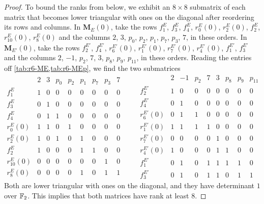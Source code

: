 \begin{proof}
To bound the ranks from below, we exhibit an $8\times8$ submatrix of each matrix that becomes lower triangular with ones on the diagonal after reordering its rows and columns. In $\mathbf M_E(0)$, take the rows $f^E_1$, $f^E_3$, $f^E_4$, $r^E_0(0)$, $r^E_2(0)$, $f^E_2$, $r^E_{10}(0)$, $r^E_8(0)$ and the columns $2$, $3$, $p_0$, $p_2$, $p_1$, $p_7$, $p_3$, $7$, in these orders. In $\mathbf M_{E'}(0)$, take the rows $f^{E'}_2$, $f^{E'}_4$, $r^{E'}_6(0)$, $r^{E'}_1(0)$, $r^{E'}_7(0)$, $r^{E'}_4(0)$, $f^{E'}_1$, $f^{E'}_3$ and the columns $2$, $-1$, $p_2$, $7$, $3$, $p_8$, $p_9$, $p_{11}$, in these orders. Reading the entries off \cref{tab:r6-ME,tab:r6-MEp}, we find the two submatrices
\[
\begin{array}{c|cccccccc}
 & 2 & 3 & p_0 & p_2 & p_1 & p_7 & p_3 & 7\\
\hline
f^E_1 & 1 & 0 & 0 & 0 & 0 & 0 & 0 & 0 \\
f^E_3 & 0 & 1 & 0 & 0 & 0 & 0 & 0 & 0 \\
f^E_4 & 0 & 1 & 1 & 0 & 0 & 0 & 0 & 0 \\
r^{E}_0(0) & 1 & 1 & 0 & 1 & 0 & 0 & 0 & 0 \\
r^{E}_2(0) & 1 & 0 & 1 & 0 & 1 & 0 & 0 & 0 \\
f^E_2 & 1 & 0 & 0 & 0 & 1 & 1 & 0 & 0 \\
r^{E}_{10}(0) & 0 & 0 & 0 & 0 & 0 & 0 & 1 & 0 \\
r^{E}_8(0) & 0 & 0 & 0 & 0 & 1 & 0 & 1 & 1
\end{array}
\qquad
\begin{array}{c|cccccccc}
 & 2 & -1 & p_2 & 7 & 3 & p_8 & p_9 & p_{11}\\
\hline
f^{E'}_2 & 1 & 0 & 0 & 0 & 0 & 0 & 0 & 0 \\
f^{E'}_4 & 0 & 1 & 0 & 0 & 0 & 0 & 0 & 0 \\
r^{E'}_6(0) & 0 & 1 & 1 & 0 & 0 & 0 & 0 & 0 \\
r^{E'}_1(0) & 1 & 1 & 1 & 1 & 0 & 0 & 0 & 0 \\
r^{E'}_7(0) & 0 & 0 & 0 & 0 & 1 & 0 & 0 & 0 \\
r^{E'}_4(0) & 1 & 0 & 0 & 0 & 1 & 1 & 0 & 0 \\
f^{E'}_1 & 0 & 1 & 0 & 1 & 1 & 1 & 1 & 0 \\
f^{E'}_3 & 0 & 1 & 0 & 1 & 1 & 0 & 1 & 1
\end{array}
\]
Both are lower triangular with ones on the diagonal, and they have determinant $1$ over $\mathbb F_2$. This implies that both matrices have rank at least $8$.


\end{proof}

